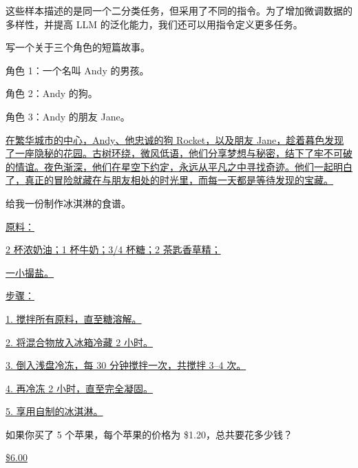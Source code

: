 这些样本描述的是同一个二分类任务，但采用了不同的指令。为了增加微调数据的多样性，并提高 LLM 的泛化能力，我们还可以用指令定义更多任务。

\vspace{0.5em}
\begin{tcolorbox}
\begin{center}
\parbox{0.9\textwidth}
{
{\color{blue} 写一个关于三个角色的短篇故事。}

{\color{blue} 角色 1：一个名叫 Andy 的男孩。}

{\color{blue} 角色 2：Andy 的狗。}

{\color{blue} 角色 3：Andy 的朋友 Jane。}

\vspace{0.3em}

\uline{在繁华城市的中心，Andy、他忠诚的狗 Rocket，以及朋友 Jane，趁着暮色发现了一座隐秘的花园。古树环绕，微风低语，他们分享梦想与秘密，结下了牢不可破的情谊。夜色渐深，他们在星空下约定，永远从平凡之中寻找奇迹。他们一起明白了，真正的冒险就藏在与朋友相处的时光里，而每一天都是等待发现的宝藏。}
}
\end{center}
\end{tcolorbox}

\vspace{0.5em}
\begin{tcolorbox}
\begin{center}
\parbox{0.9\textwidth}
{
{\color{blue} 给我一份制作冰淇淋的食谱。}

\vspace{0.3em}

\underline{原料：}

\underline{2 杯浓奶油；1 杯牛奶；3/4 杯糖；2 茶匙香草精；}

\underline{一小撮盐。}

\underline{步骤：}

\underline{1. 搅拌所有原料，直至糖溶解。}

\underline{2. 将混合物放入冰箱冷藏 2 小时。}

\underline{3. 倒入浅盘冷冻，每 30 分钟搅拌一次，共搅拌 3--4 次。}

\underline{4. 再冷冻 2 小时，直至完全凝固。}

\underline{5. 享用自制的冰淇淋。}
}
\end{center}
\end{tcolorbox}

\vspace{0.5em}
\begin{tcolorbox}
\begin{center}
\parbox{0.9\textwidth}
{
{\color{blue} 如果你买了 5 个苹果，每个苹果的价格为 \$1.20，总共要花多少钱？ }

\vspace{0.3em}

\underline{\$6.00}
}
\end{center}
\end{tcolorbox}

